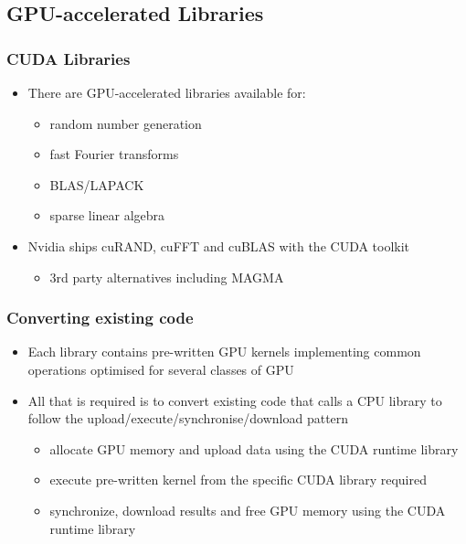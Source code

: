 \subsection{GPU-accelerated Libraries}\label{gpu-accelerated-libraries}

\subsubsection{CUDA Libraries}\label{cuda-libraries}

\begin{itemize}
\itemsep1pt\parskip0pt
\item
  There are GPU-accelerated libraries available for:

  \begin{itemize}
  \itemsep1pt\parskip0pt
  \item
    random number generation
  \item
    fast Fourier transforms
  \item
    BLAS/LAPACK
  \item
    sparse linear algebra
  \end{itemize}
\item
  Nvidia ships cuRAND, cuFFT and cuBLAS with the CUDA toolkit

  \begin{itemize}
  \itemsep1pt\parskip0pt
  \item
    3rd party alternatives including MAGMA
  \end{itemize}
\end{itemize}

\subsubsection{Converting existing code}\label{converting-existing-code}

\begin{itemize}
\itemsep1pt\parskip0pt
\item
  Each library contains pre-written GPU kernels implementing common
  operations optimised for several classes of GPU
\item
  All that is required is to convert existing code that calls a CPU
  library to follow the upload/execute/synchronise/download pattern

  \begin{itemize}
  \itemsep1pt\parskip0pt
  \item
    allocate GPU memory and upload data using the CUDA runtime library
  \item
    execute pre-written kernel from the specific CUDA library required
  \item
    synchronize, download results and free GPU memory using the CUDA
    runtime library
  \end{itemize}
\end{itemize}

